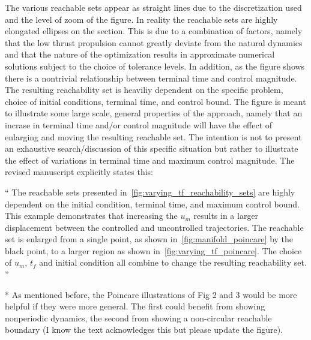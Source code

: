 \documentclass[11pt]{article}
\newenvironment{correction}{\begin{list}{}{\setlength{\leftmargin}{1cm}\setlength{\rightmargin}{1cm}}\vspace{\parsep}\item[]``}{''\end{list}}
\begin{document}
\begin{itemize}
        The various reachable sets appear as straight lines due to the discretization used and the level of zoom of the figure.
        In reality the reachable sets are highly elongated ellipses on the \Poincare section.
        This is due to a combination of factors, namely that the low thrust propulsion cannot greatly deviate from the natural dynamics and that the nature of the optimization results in approximate numerical solutions subject to the choice of tolerance levels.
        In addition, as the figure shows there is a nontrivial relationship between terminal time and control magnitude. 
        The resulting reachability set is heaviliy dependent on the specific problem, choice of initial conditions, terminal time, and control bound.
        The figure is meant to illustrate some large scale, general properties of the approach, namely that an incrase in terminal time and/or control magnitude will have the effect of enlarging and moving the resulting reachable set.
     The intention is not to present an exhaustive search/discussion of this specific situation but rather to illustrate the effect of variations in terminal time and maximum control magnitude.
        The revised manuscript explicitly states this:
        \begin{correction}
            The reachable sets presented in~\cref{fig:varying_tf_reachability_sets} are highly dependent on the initial condition, terminal time, and maximum control bound. 
            This example demonstrates that increasing the \( u_m \) results in a larger displacement between the controlled and uncontrolled trajectories.
            The reachable set is enlarged from a single point, as shown in~\cref{fig:manifold_poincare} by the black point, to a larger region as shown in~\cref{fig:varying_tf_poincare}.
            The choice of \( u_m\), \( t_f \) and initial condition all combine to change the resulting reachability set. 
        \end{correction}
    \item
        \begin{itshape}

            * As mentioned before, the Poincare illustrations of Fig 2 and 3 would be
            more helpful if they were more general.  The first could benefit from
            showing nonperiodic dynamics, the second from showing a non-circular
            reachable boundary (I know the text acknowledges this but please update the
            figure).  
        \end{itshape}


\end{itemize}
\end{document}
